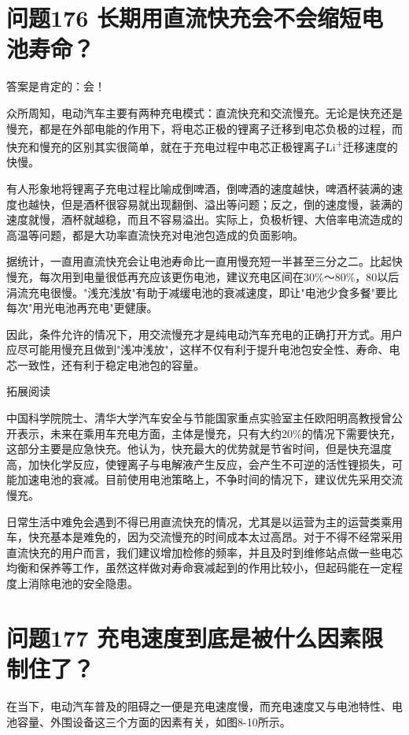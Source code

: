 \documentclass[12pt,UTF8]{ctexbook}
\begin{document}
\section{问题176 长期用直流快充会不会缩短电池寿命？}

答案是肯定的：会！

众所周知，电动汽车主要有两种充电模式：直流快充和交流慢充。无论是快充还是慢充，都是在外部电能的作用下，将电芯正极的锂离子迁移到电芯负极的过程，而快充和慢充的区别其实很简单，就在于充电过程中电芯正极锂离子Li\textsuperscript{+}迁移速度的快慢。

有人形象地将锂离子充电过程比喻成倒啤酒，倒啤酒的速度越快，啤酒杯装满的速度也越快，但是酒杯很容易就出现翻倒、溢出等问题；反之，倒的速度慢，装满的速度就慢，酒杯就越稳，而且不容易溢出。实际上，负极析锂、大倍率电流造成的高温等问题，都是大功率直流快充对电池包造成的负面影响。

据统计，一直用直流快充会让电池寿命比一直用慢充短一半甚至三分之二。比起快慢充，每次用到电量很低再充应该更伤电池，建议充电区间在30\%～80\%，80以后涓流充电很慢。"浅充浅放"有助于减缓电池的衰减速度，即让"电池少食多餐"要比每次"用光电池再充电"更健康。

因此，条件允许的情况下，用交流慢充才是纯电动汽车充电的正确打开方式。用户应尽可能用慢充且做到"浅冲浅放"，这样不仅有利于提升电池包安全性、寿命、电芯一致性，还有利于稳定电池包的容量。

拓展阅读

中国科学院院士、清华大学汽车安全与节能国家重点实验室主任欧阳明高教授曾公开表示，未来在乘用车充电方面，主体是慢充，只有大约20\%的情况下需要快充，这部分主要是应急快充。他认为，快充最大的优势就是节省时间，但是快充温度高，加快化学反应，使锂离子与电解液产生反应，会产生不可逆的活性锂损失，可能加速电池的衰减。目前使用电池策略上，不争时间的情况下，建议优先采用交流慢充。

日常生活中难免会遇到不得已用直流快充的情况，尤其是以运营为主的运营类乘用车，快充基本是难免的，因为交流慢充的时间成本太过高昂。对于不得不经常采用直流快充的用户而言，我们建议增加检修的频率，并且及时到维修站点做一些电芯均衡和保养等工作，虽然这样做对寿命衰减起到的作用比较小，但起码能在一定程度上消除电池的安全隐患。

\section{问题177 充电速度到底是被什么因素限制住了？}

在当下，电动汽车普及的阻碍之一便是充电速度慢，而充电速度又与电池特性、电池容量、外围设备这三个方面的因素有关，如图8-10所示。
\end{document}
